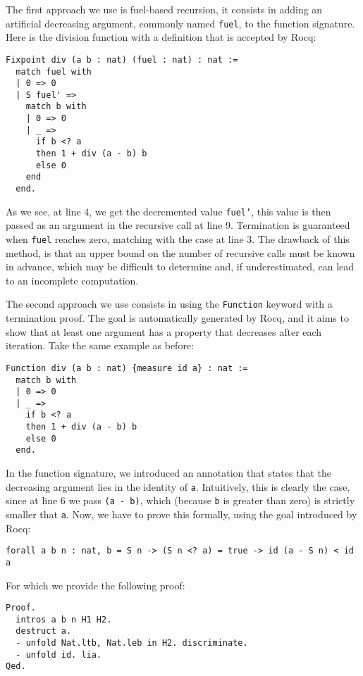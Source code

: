 The first approach we use is fuel-based recursion, it consists in adding an artificial decreasing argument, commonly named \texttt{fuel}, to the function signature.
Here is the division function with a definition that is accepted by Rocq:

\begin{lstlisting}[style=Rocq]
Fixpoint div (a b : nat) (fuel : nat) : nat :=
  match fuel with
  | 0 => 0
  | S fuel' =>
    match b with
    | 0 => 0
    | _ =>
      if b <? a
      then 1 + div (a - b) b
      else 0
    end
  end.
\end{lstlisting}

As we see, at line 4, we get the decremented value \texttt{fuel'}, this value is then passed as an argument in the recursive call at line 9.
Termination is guaranteed when \texttt{fuel} reaches zero, matching with the case at line 3.
The drawback of this method, is that an upper bound on the number of recursive calls must be known in advance, which may be difficult to determine and, if underestimated, can lead to an incomplete computation.

The second approach we use consists in using the \texttt{Function} keyword with a termination proof. The goal is automatically generated by Rocq, and it aims to show that at least one argument has a property that decreases after each iteration.
Take the same example as before:

\begin{lstlisting}[style=Rocq]
Function div (a b : nat) {measure id a} : nat :=
  match b with
  | 0 => 0
  | _ =>
    if b <? a
    then 1 + div (a - b) b
    else 0
  end.
\end{lstlisting}

In the function signature, we introduced an annotation that states that the decreasing argument lies in the identity of \texttt a.
Intuitively, this is clearly the case, since at line 6 we pass \texttt{(a - b)}, which (because \texttt b is greater than zero) is strictly smaller that \texttt a.
Now, we have to prove this formally, using the goal introduced by Rocq:

\begin{lstlisting}[style=Rocq]
forall a b n : nat, b = S n -> (S n <? a) = true -> id (a - S n) < id a
\end{lstlisting}

For which we provide the following proof:

\begin{lstlisting}[style=Rocq]
Proof.
  intros a b n H1 H2.
  destruct a.
  - unfold Nat.ltb, Nat.leb in H2. discriminate.
  - unfold id. lia.
Qed.
\end{lstlisting}

